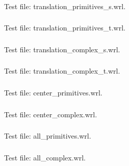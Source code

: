\subsubsection{\TTIa\TTIb}
\label{sec:translation}
Test file: translation\_primitives\_s.wrl.\newline

\subsubsection{\TTJa\TTJb}
Test file: translation\_primitives\_t.wrl.\newline

\subsubsection{\TTKa\TTKb}
Test file: translation\_complex\_s.wrl.\newline

\subsubsection{\TTLa\TTLb}
Test file: translation\_complex\_t.wrl.\newline

\subsubsection{\TTMa\TTMb}
Test file: center\_primitives.wrl.\newline

\subsubsection{\TTNa\TTNb}
Test file: center\_complex.wrl.\newline

\subsubsection{\TTOa\TTOb}
Test file: all\_primitives.wrl.\newline

\subsubsection{\TTPa\TTPb}
Test file: all\_complex.wrl.\newline
